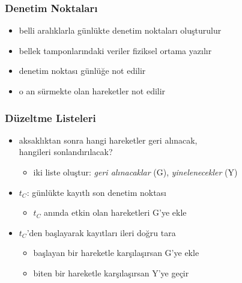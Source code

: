 \documentclass[dvipsnames]{beamer}
\theoremstyle{definition}
\theoremstyle{example}
\theoremstyle{plain}
\begin{document}
\begin{frame}
  \frametitle{Denetim Noktaları}

  \begin{itemize}
    \item belli aralıklarla günlükte \alert{denetim noktaları} oluşturulur

    \pause
    \medskip
    \item bellek tamponlarındaki veriler fiziksel ortama yazılır
    \item denetim noktası günlüğe not edilir
    \item o an sürmekte olan hareketler not edilir
  \end{itemize}
\end{frame}

\begin{frame}
  \frametitle{Düzeltme Listeleri}

  \begin{itemize}
    \item aksaklıktan sonra hangi hareketler geri alınacak,\\
      hangileri sonlandırılacak?
    \begin{itemize}
      \item iki liste oluştur: \emph{geri alınacaklar} (G),
        \emph{yinelenecekler} (Y)
    \end{itemize}

    \pause
    \item $t_C$: günlükte kayıtlı son denetim noktası
    \begin{itemize}
      \item $t_C$ anında etkin olan hareketleri G'ye ekle
    \end{itemize}

    \pause
    \item $t_C$'den başlayarak kayıtları ileri doğru tara
    \begin{itemize}
      \item başlayan bir hareketle karşılaşırsan G'ye ekle
      \item biten bir hareketle karşılaşırsan Y'ye geçir
    \end{itemize}
  \end{itemize}
\end{frame}
\end{document}
